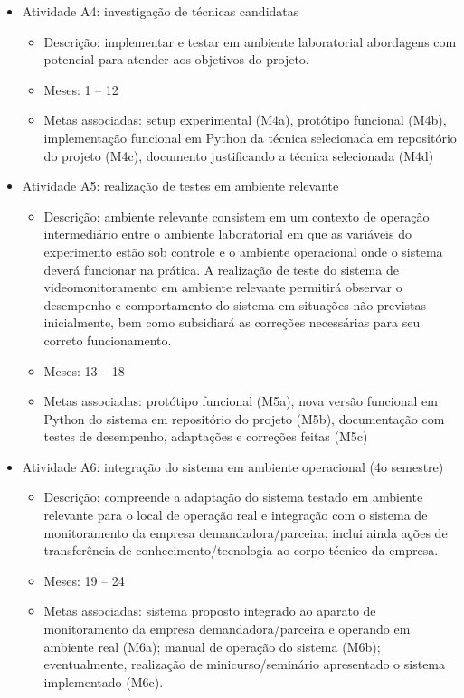 \begin{itemize}
\begin{itemize}
	\end{itemize}
	\item Atividade A4: investigação de técnicas candidatas
	\begin{itemize}
		\item Descrição: implementar e testar em ambiente laboratorial abordagens com potencial para atender aos objetivos do projeto.
		\item Meses: 1 -- 12
		\item Metas associadas: setup experimental (M4a), protótipo funcional (M4b), implementação funcional em Python da técnica selecionada em repositório do projeto (M4c), documento justificando a técnica selecionada (M4d)
	\end{itemize}
	\item Atividade A5: realização de testes em ambiente relevante
	\begin{itemize}
		\item Descrição: ambiente relevante consistem em um contexto de operação intermediário entre o ambiente laboratorial em que as variáveis do experimento estão sob controle e o ambiente operacional onde o sistema deverá funcionar na prática. A realização de teste do sistema de videomonitoramento em ambiente relevante permitirá observar o desempenho e comportamento do sistema em situações não previstas inicialmente, bem como subsidiará as correções necessárias para seu correto funcionamento.
		\item Meses: 13 -- 18
		\item Metas associadas: protótipo funcional (M5a), nova versão funcional em Python do sistema em repositório do projeto (M5b), documentação com testes de desempenho, adaptações e correções feitas (M5c)
	\end{itemize}
	\item Atividade A6: integração do sistema em ambiente operacional (4o semestre)
	\begin{itemize}
		\item Descrição: compreende a adaptação do sistema testado em ambiente relevante para o local de operação real e integração com o sistema de monitoramento da empresa demandadora/parceira; inclui ainda ações de transferência de conhecimento/tecnologia ao corpo técnico da empresa.
		\item Meses: 19 -- 24
		\item Metas associadas: sistema proposto integrado ao aparato de monitoramento da empresa demandadora/parceira e operando em ambiente real (M6a); manual de operação do sistema (M6b); eventualmente, realização de minicurso/seminário apresentado o sistema implementado (M6c).

\end{itemize}
\end{itemize}

